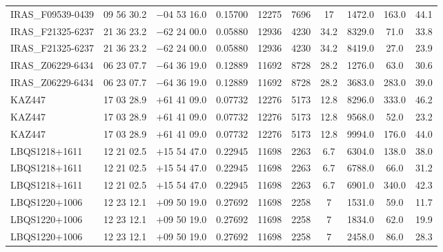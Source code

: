 \begin{landscape}
\begin{center}
\begin{longtable}{l c c c c c c c c c}
IRAS\_F09539-0439  &       09 56 30.2  &         $-$04 53 16.0  &       0.15700  & 12275  &   7696  &       17  &        1472.0  &  163.0  &  44.1  \\
IRAS\_F21325-6237  &       21 36 23.2  &         $-$62 24 00.0  &       0.05880  & 12936  &   4230  &       34.2  &      8329.0  &  71.0  &   33.8  \\
IRAS\_F21325-6237  &       21 36 23.2  &         $-$62 24 00.0  &       0.05880  & 12936  &   4230  &       34.2  &      8419.0  &  27.0  &   23.9  \\
IRAS\_Z06229-6434  &       06 23 07.7  &         $-$64 36 19.0  &       0.12889  & 11692  &   8728  &       28.2  &      1276.0  &  63.0  &   30.6  \\
IRAS\_Z06229-6434  &       06 23 07.7  &         $-$64 36 19.0  &       0.12889  & 11692  &   8728  &       28.2  &      3683.0  &  283.0  &  39.0  \\
KAZ447  &                  17 03 28.9  &         $+$61 41 09.0  &       0.07732  & 12276  &   5173  &       12.8  &      8296.0  &  333.0  &  46.2  \\
KAZ447  &                  17 03 28.9  &         $+$61 41 09.0  &       0.07732  & 12276  &   5173  &       12.8  &      9568.0  &  52.0  &   23.2  \\
KAZ447  &                  17 03 28.9  &         $+$61 41 09.0  &       0.07732  & 12276  &   5173  &       12.8  &      9994.0  &  176.0  &  44.0  \\
LBQS1218+1611  &           12 21 02.5  &         $+$15 54 47.0  &       0.22945  & 11698  &   2263  &       6.7  &       6304.0  &  138.0  &  38.0  \\
LBQS1218+1611  &           12 21 02.5  &         $+$15 54 47.0  &       0.22945  & 11698  &   2263  &       6.7  &       6788.0  &  66.0  &   31.2  \\
LBQS1218+1611  &           12 21 02.5  &         $+$15 54 47.0  &       0.22945  & 11698  &   2263  &       6.7  &       6901.0  &  340.0  &  42.3  \\
LBQS1220+1006  &           12 23 12.1  &         $+$09 50 19.0  &       0.27692  & 11698  &   2258  &       7  &         1531.0  &  59.0  &   11.7  \\
LBQS1220+1006  &           12 23 12.1  &         $+$09 50 19.0  &       0.27692  & 11698  &   2258  &       7  &         1834.0  &  62.0  &   19.9  \\
LBQS1220+1006  &           12 23 12.1  &         $+$09 50 19.0  &       0.27692  & 11698  &   2258  &       7  &         2458.0  &  86.0  &   28.3  \\

\end{longtable}
\end{center}
\end{landscape}
